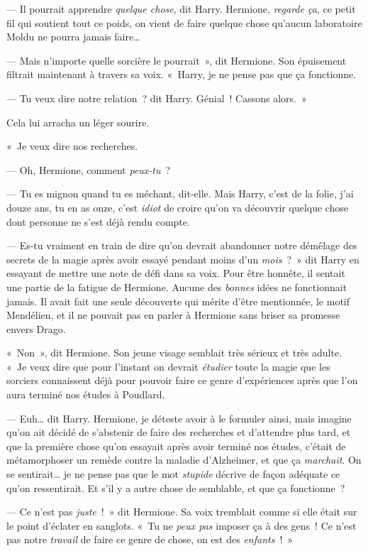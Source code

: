 --- Il pourrait apprendre \emph{quelque chose}, dit Harry. Hermione, \emph{regarde ça}, ce petit fil qui soutient tout ce poids, on vient de faire quelque chose qu'aucun laboratoire Moldu ne pourra jamais faire…

--- Mais n'importe quelle sorcière le pourrait~», dit Hermione. Son épuisement filtrait maintenant à travers sa voix. «~Harry, je ne pense pas que ça fonctionne.

--- Tu veux dire notre relation~? dit Harry. Génial~! Cassons alors.~»

Cela lui arracha un léger sourire.

«~Je veux dire nos recherches.

--- Oh, Hermione, comment \emph{peux-tu}~?

--- Tu es mignon quand tu es méchant, dit-elle. Mais Harry, c'est de la folie, j'ai douze ans, tu en as onze, c'est \emph{idiot} de croire qu'on va découvrir quelque chose dont personne ne s'est déjà rendu compte.

--- Es-tu vraiment en train de dire qu'on devrait abandonner notre démêlage des secrets de la magie après avoir essayé pendant moins d'un \emph{mois}~?~» dit Harry en essayant de mettre une note de défi dans sa voix. Pour être honnête, il sentait une partie de la fatigue de Hermione. Aucune des \emph{bonnes} idées ne fonctionnait jamais. Il avait fait une seule découverte qui mérite d'être mentionnée, le motif Mendélien, et il ne pouvait pas en parler à Hermione sans briser sa promesse envers Drago.

«~Non~», dit Hermione. Son jeune visage semblait très sérieux et très adulte. «~Je veux dire que pour l'instant on devrait \emph{étudier} toute la magie que les sorciers connaissent déjà pour pouvoir faire ce genre d'expériences après que l'on aura terminé nos études à Poudlard.

--- Euh… dit Harry. Hermione, je déteste avoir à le formuler ainsi, mais imagine qu'on ait décidé de s'abstenir de faire des recherches et d'attendre plus tard, et que la première chose qu'on essayait après avoir terminé nos études, c'était de métamorphoser un remède contre la maladie d'Alzheimer, et que ça \emph{marchait}. On se sentirait… je ne pense pas que le mot \emph{stupide} décrive de façon adéquate ce qu'on ressentirait. Et s'il y a autre chose de semblable, et que ça fonctionne~?

--- Ce n'est pas \emph{juste}~!~» dit Hermione. Sa voix tremblait comme si elle était sur le point d'éclater en sanglots. «~Tu ne \emph{peux pas} imposer ça à des gens~! Ce n'est pas notre \emph{travail} de faire ce genre de chose, on est des \emph{enfants}~!~»

